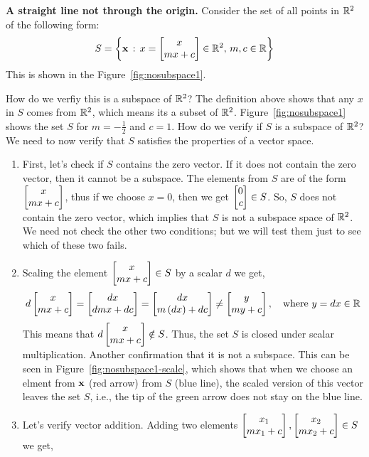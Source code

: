 \begin{boxedstuff}
\begin{example}
    \textbf{A straight line not through the origin.} Consider the set of all points in $\mathbb{R}^2$ of the following form:
    \[ S = \lc \mf{x} \, : \, x = \bmxc x \\ m x + c \emx \in \mb{R}^2, \, m, c \in \mb{R} \rc \]
    This is shown in the Figure~\ref{fig:nosubspace1}.

    How do we verfiy this is a subspace of $\mathbb{R}^2$? The definition above shows that any $x$ in $S$ comes from $\mathbb{R}^2$, which means its a subset of $\mathbb{R}^2$. Figure~\ref{fig:nosubspace1} shows the set $S$ for $m = -\frac{1}{2}$ and $c = 1$.
    \noindent How do we verify if $S$ is a subspace of $\mathbb{R}^2$? We need to now verify that $S$ satisfies the properties of a vector space.
    \begin{enumerate}
        \item First, let's check if $S$ contains the zero vector. If it does not contain the zero vector, then it cannot be a subspace. The elements from $S$ are of the form $\bmxc x \\ m x + c\emx$, thus if we choose $x = 0$, then we get $\bmx 0 \\ c \emx \in S$. So, $S$ does not contain the zero vector, which implies that $S$ is not a subspace space of $\mathbb{R}^2$. We need not check the other two conditions; but we will test them just to see which of these two fails.
        \item Scaling the element $\bmxc x \\ m x + c \emx \in S$ by a scalar $d$ we get,
        \[ d \bmxc x \\ m x + c\emx = \bmxc d x \\ d m x + d c \emx = \bmxc d x \\ m \pp{d x} + dc \emx \neq \bmxc y \\ m y + c\emx, \quad \text{where} \,\, y = d x \in \mb{R} \]
        This means that $d \bmxc x \\ m x + c\emx \notin S$. Thus, the set $S$ is closed under scalar multiplication. Another confirmation that it is not a subspace. This can be seen in Figure~\ref{fig:nosubspace1-scale}, which shows that when we choose an elment from $\mathbf{x}$ (red arrow) from $S$ (blue line), the scaled version of this vector leaves the set $S$, i.e., the tip of the green arrow does not stay on the blue line.
        \item Let's verify vector addition. Adding two elements $\bmxc x_1 \\ m x_1 + c\emx, \bmxc x_2 \\ m x_2 + c\emx \in S$ we get,

\end{enumerate}
\end{example}
\end{boxedstuff}
